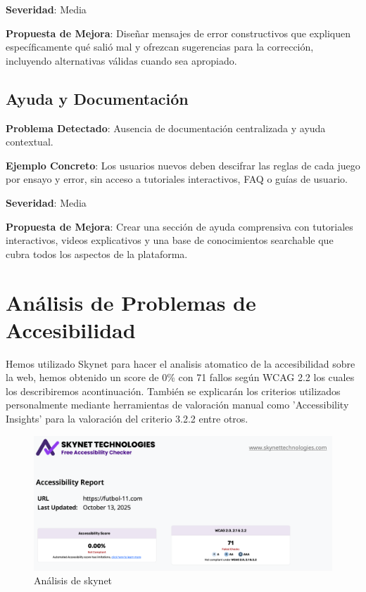 \documentclass{article}
\begin{document}
	\noindent
	\textbf{Severidad}: Media
	
	\noindent
	\textbf{Propuesta de Mejora}: Diseñar mensajes de error constructivos que expliquen específicamente qué salió mal y ofrezcan sugerencias para la corrección, incluyendo alternativas válidas cuando sea apropiado.

	\subsection{Ayuda y Documentación}
	\noindent
	\textbf{Problema Detectado}: Ausencia de documentación centralizada y ayuda contextual.
	
	\noindent
	\textbf{Ejemplo Concreto}: Los usuarios nuevos deben descifrar las reglas de cada juego por ensayo y error, sin acceso a tutoriales interactivos, FAQ o guías de usuario.
	
	\noindent
	\textbf{Severidad}: Media
	
	\noindent
	\textbf{Propuesta de Mejora}: Crear una sección de ayuda comprensiva con tutoriales interactivos, videos explicativos y una base de conocimientos searchable que cubra todos los aspectos de la plataforma.

	\section{Análisis de Problemas de Accesibilidad}

	\noindent
	Hemos utilizado Skynet para hacer el analisis atomatico de la accesibilidad sobre la web, hemos obtenido un score de 0\% con 71 fallos según WCAG 2.2 los cuales los describiremos acontinuación. También se explicarán los criterios utilizados personalmente mediante herramientas de valoración manual como 'Accessibility Insights' para la valoración del criterio 3.2.2 entre otros.

	\begin{figure}[H]
	\centering
	\includegraphics[width=\textwidth]{skynet.png}
	\caption{Análisis de skynet}
	\end{figure}
\end{document}
